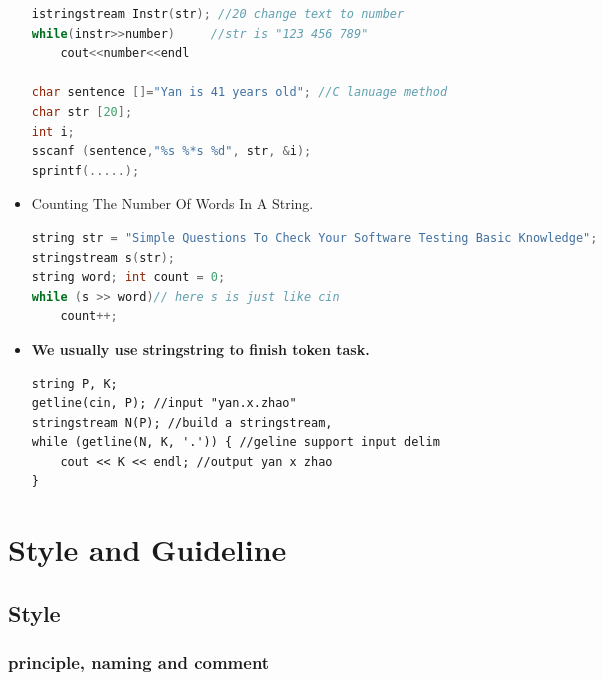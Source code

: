 \documentclass[a4paper,11pt,twoside]{book}
\begin{document}
\begin{itemize}
\begin{lstlisting}[frame=single, language=c++]
istringstream Instr(str); //20 change text to number  
while(instr>>number)     //str is "123 456 789"
	cout<<number<<endl
	
char sentence []="Yan is 41 years old"; //C lanuage method
char str [20];
int i;
sscanf (sentence,"%s %*s %d", str, &i);
sprintf(.....);
\end{lstlisting}

\item Counting The Number Of Words In A String.
\begin{lstlisting}[frame=single, language=c++]
string str = "Simple Questions To Check Your Software Testing Basic Knowledge"; 
stringstream s(str);  
string word; int count = 0;
while (s >> word)// here s is just like cin 
	count++;
\end{lstlisting}

\item \textbf{We usually use stringstring to finish token task.}
\begin{lstlisting}[]
string P, K;
getline(cin, P); //input "yan.x.zhao"
stringstream N(P); //build a stringstream,
while (getline(N, K, '.')) { //geline support input delim
    cout << K << endl; //output yan x zhao
}
\end{lstlisting}
\end{itemize}


\chapter{Style and Guideline}

\section{Style}
\subsection{principle, naming and comment}
\end{document}
